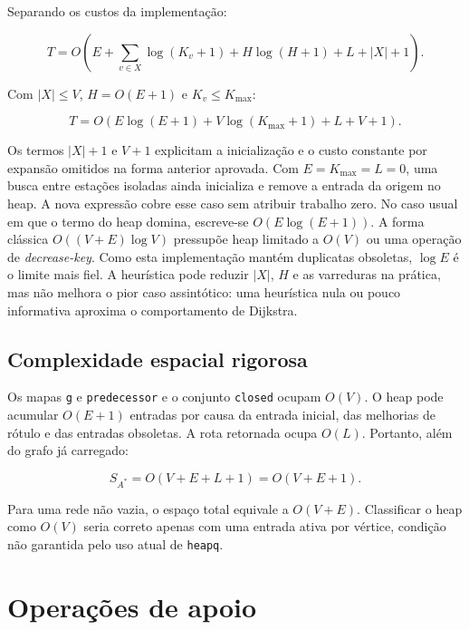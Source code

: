 \documentclass[11pt,a4paper]{article}
\begin{document}
Separando os custos da implementação:

\[
T=O\left(
E+\sum_{v\in X}\log(K_v+1)+H\log(H+1)+L+|X|+1
\right).
\]

Com $|X|\le V$, $H=O(E+1)$ e $K_v\le K_{\max}$:

\[
T=O\left(E\log(E+1)+V\log(K_{\max}+1)+L+V+1\right).
\]

Os termos $|X|+1$ e $V+1$ explicitam a inicialização e o custo constante por
expansão omitidos na forma anterior aprovada. Com $E=K_{\max}=L=0$, uma busca
entre estações isoladas ainda inicializa e remove a entrada da origem no heap.
A nova expressão cobre esse caso sem atribuir trabalho zero. No caso usual em
que o termo do heap domina, escreve-se $O(E\log(E+1))$.
A forma clássica $O((V+E)\log V)$ pressupõe heap limitado a $O(V)$ ou uma
operação de \emph{decrease-key}. Como esta implementação mantém duplicatas
obsoletas, $\log E$ é o limite mais fiel. A heurística pode reduzir $|X|$, $H$ e
as varreduras na prática, mas não melhora o pior caso assintótico: uma
heurística nula ou pouco informativa aproxima o comportamento de Dijkstra.

\subsection{Complexidade espacial rigorosa}

Os mapas \texttt{g} e \texttt{predecessor} e o conjunto \texttt{closed}
ocupam $O(V)$. O heap pode acumular $O(E+1)$ entradas por causa da entrada inicial,
das melhorias de
rótulo e das entradas obsoletas. A rota retornada ocupa $O(L)$. Portanto, além
do grafo já carregado:

\[
S_{A^*}=O(V+E+L+1)=O(V+E+1).
\]

Para uma rede não vazia, o espaço total equivale a $O(V+E)$. Classificar o heap
como $O(V)$ seria correto apenas com uma entrada ativa por
vértice, condição não garantida pelo uso atual de \texttt{heapq}.

\section{Operações de apoio}
\end{document}
